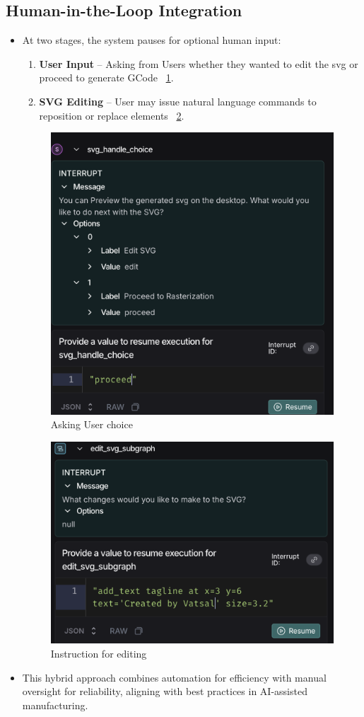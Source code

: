 \subsection{Human-in-the-Loop Integration}
\begin{itemize}
	\item At two stages, the system pauses for optional human input:
	\begin{enumerate}
		\item \textbf{User Input} – Asking from Users whether they wanted to edit the svg or proceed to generate GCode ~\ref{user}.
		\item \textbf{SVG Editing} – User may issue natural language commands to reposition or replace elements ~\ref{svg-edit}.
		\end{enumerate}
		
					\begin{figure}
			\begin{center}
				\includegraphics[width=0.6\linewidth]{Images/user-input.png}
				\caption{Asking User choice}
				\label{user} 
			\end{center}
		\end{figure}
		
		\begin{figure}
			\begin{center}
				\includegraphics[width=0.6\linewidth]{Images/svg-edit.png}
				\caption{Instruction for editing}
				\label{svg-edit} 
			\end{center}
		\end{figure}
		
	\item This hybrid approach combines automation for efficiency with manual oversight for reliability, aligning with best practices in AI-assisted manufacturing.
\end{itemize}

